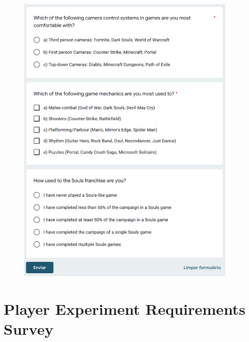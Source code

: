 \begin{figure}[!ht]
    \begin{center}
        \includegraphics[width=28em]{figures/fig-player-profile-survey-pt3.png}
    \end{center}
\end{figure}

\chapter{Player Experiment Requirements Survey}
\label{anx:player-experiment-requirements-survey}

